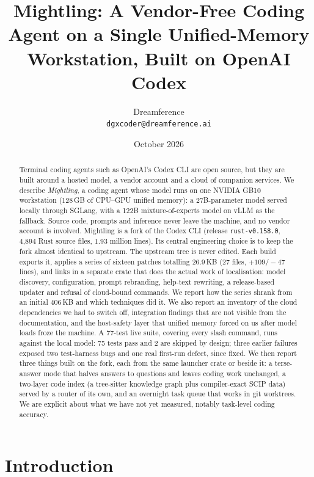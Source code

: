 \documentclass[11pt]{article}
\title{Mightling: A Vendor-Free Coding Agent on a Single Unified-Memory Workstation, Built on
OpenAI Codex}
\author{Dreamference\\
\texttt{dgxcoder@dreamference.ai}}
\date{October 2026}
\newcommand{\code}[1]{\texttt{#1}}
\begin{document}
\maketitle

\begin{abstract}
Terminal coding agents such as OpenAI's Codex CLI are open source, but they are built around a
hosted model, a vendor account and a cloud of companion services. We describe \emph{Mightling}, a
coding agent whose model runs on one NVIDIA GB10 workstation (128\,GB of CPU--GPU unified memory):
a 27B-parameter model served locally through SGLang, with a 122B mixture-of-experts model on
vLLM as the fallback. Source code, prompts and
inference never leave the machine, and no vendor account is involved. Mightling is a fork of
the Codex CLI (release \code{rust-v0.158.0}, 4{,}894 Rust source files, 1.93 million lines). Its
central engineering choice is to keep the fork almost identical to upstream. The upstream tree is
never edited. Each build exports it, applies a series of sixteen patches totalling 26.9\,KB (27 files,
$+109/-47$ lines), and links in a separate crate that does the actual work of localisation: model
discovery, configuration, prompt rebranding, help-text rewriting, a release-based updater and
refusal of cloud-bound commands. We report how the series shrank from an initial 406\,KB and which
techniques did it. We also report an inventory of the cloud dependencies we had to switch off,
integration findings that are not visible from the documentation, and the host-safety layer that
unified memory forced on us after model loads froze the machine. A 77-test live suite, covering
every slash command, runs against the local model: 75 tests pass and 2 are skipped by design; three
earlier failures exposed two test-harness bugs and one real first-run defect, since fixed. We then
report three things built on the fork, each from the same launcher crate or beside it: a
terse-answer mode that halves answers to questions and leaves coding work unchanged, a two-layer
code index (a tree-sitter knowledge graph plus compiler-exact SCIP data) served by a router of its
own, and an overnight task queue that works in git worktrees. We are explicit about what we have
not yet measured, notably task-level coding accuracy.
\end{abstract}

\section{Introduction}
\end{document}
